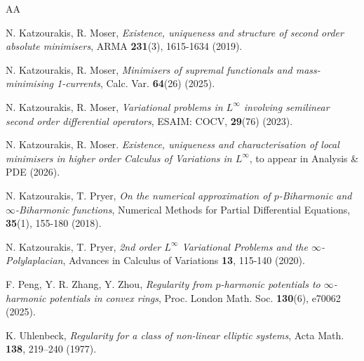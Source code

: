 \documentclass[a4paper,11pt]{article}
\numberwithin{equation}{section}
\theoremstyle{definition}
\begin{document}
\begin{thebibliography}{AA}


N. Katzourakis, R. Moser, {\it Existence, uniqueness and structure of second order absolute minimisers}, ARMA {\bf 231}(3), 1615-1634 (2019).

N. Katzourakis, R. Moser, {\it Minimisers of supremal functionals and mass-minimising 1-currents}, Calc. Var.{ \bf 64}(26) (2025).

N. Katzourakis, R. Moser, {\it Variational problems in $L^\infty$ involving semilinear second order differential operators}, ESAIM: COCV, {\bf 29}(76) (2023).

N. Katzourakis, R. Moser. {\it Existence, uniqueness and characterisation of local minimisers in higher order Calculus of Variations in $L^\infty$}, to appear in Analysis \& PDE (2026).

N. Katzourakis, T. Pryer, {\it On the numerical approximation of $p$-Biharmonic and $\infty$-Biharmonic functions},
Numerical Methods for Partial Differential Equations, {\bf 35}(1), 155-180 (2018).


N. Katzourakis, T. Pryer, {\it 2nd order $L^\infty$ Variational Problems and the $\infty$-Polylaplacian},
Advances in Calculus of Variations {\bf 13}, 115-140 (2020).





F. Peng, Y. R. Zhang, Y. Zhou, \emph{Regularity from $p$-harmonic potentials to $\infty$-harmonic potentials in convex rings}, Proc. London Math. Soc.
\textbf{130}(6), e70062 (2025).




K. Uhlenbeck, {\it Regularity for a class of non-linear elliptic systems}, Acta Math. {\bf138}, 219--240 (1977).



\end{thebibliography}
\end{document}
